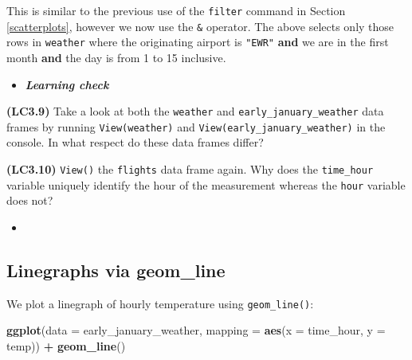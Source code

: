 \documentclass[12pt,]{krantz}
\makeatletter
\newenvironment{Shaded}{\begin{snugshade}}{\end{snugshade}}
\newcommand{\KeywordTok}[1]{\textcolor[rgb]{0.27,0.27,0.27}{\textbf{#1}}}
\newcommand{\DataTypeTok}[1]{\textcolor[rgb]{0.27,0.27,0.27}{#1}}
\newcommand{\DecValTok}[1]{\textcolor[rgb]{0.06,0.06,0.06}{#1}}
\newcommand{\StringTok}[1]{\textcolor[rgb]{0.5,0.5,0.5}{#1}}
\newcommand{\OperatorTok}[1]{\textcolor[rgb]{0.43,0.43,0.43}{\textbf{#1}}}
\newcommand{\NormalTok}[1]{#1}
\newenvironment{kframe}{%
\medskip{}
\setlength{\fboxsep}{.8em}
 \def\at@end@of@kframe{}%
 \ifinner\ifhmode%
  \def\at@end@of@kframe{\end{minipage}}%
  \begin{minipage}{\columnwidth}%
 \fi\fi%
 \def\FrameCommand##1{\hskip\@totalleftmargin \hskip-\fboxsep
 \colorbox{shadecolor}{##1}\hskip-\fboxsep
     \hskip-\linewidth \hskip-\@totalleftmargin \hskip\columnwidth}%
 \MakeFramed {\advance\hsize-\width
   \@totalleftmargin\z@ \linewidth\hsize
   \@setminipage}}%
 {\par\unskip\endMakeFramed%
 \at@end@of@kframe}
\renewenvironment{Shaded}{\begin{kframe}}{\end{kframe}}
\newenvironment{rmdblock}[1]
  {\begin{shaded*}
  \begin{itemize}
  \renewcommand{\labelitemi}{
    \raisebox{-.7\height}[0pt][0pt]{
    }
  }
  \item
  }
  {
  \end{itemize}
  \end{shaded*}
  }
\newenvironment{learncheck}
  {\begin{rmdblock}{warning}}
  {\end{rmdblock}}
\theoremstyle{definition}
\theoremstyle{definition}
\theoremstyle{definition}
\theoremstyle{remark}
\makeatother
\begin{document}
\begin{Shaded}
\end{Shaded}

This is similar to the previous use of the \texttt{filter} command in
Section \ref{scatterplots}, however we now use the \texttt{\&} operator.
The above selects only those rows in \texttt{weather} where the
originating airport is \texttt{"EWR"} \textbf{and} we are in the first
month \textbf{and} the day is from 1 to 15 inclusive.

\begin{learncheck}
\textbf{\emph{Learning check}}
\end{learncheck}

\textbf{(LC3.9)} Take a look at both the \texttt{weather} and
\texttt{early\_january\_weather} data frames by running
\texttt{View(weather)} and \texttt{View(early\_january\_weather)} in the
console. In what respect do these data frames differ?

\textbf{(LC3.10)} \texttt{View()} the \texttt{flights} data frame again.
Why does the \texttt{time\_hour} variable uniquely identify the hour of
the measurement whereas the \texttt{hour} variable does not?

\begin{learncheck}

\end{learncheck}

\subsection{Linegraphs via geom\_line}\label{geomline}

We plot a linegraph of hourly temperature using \texttt{geom\_line()}:

\begin{Shaded}
\begin{Highlighting}[]
\KeywordTok{ggplot}\NormalTok{(}\DataTypeTok{data =}\NormalTok{ early_january_weather, }
       \DataTypeTok{mapping =} \KeywordTok{aes}\NormalTok{(}\DataTypeTok{x =}\NormalTok{ time_hour, }\DataTypeTok{y =}\NormalTok{ temp)) }\OperatorTok{+}
\StringTok{  }\KeywordTok{geom_line}\NormalTok{()}
\end{Highlighting}
\end{Shaded}
\end{document}
